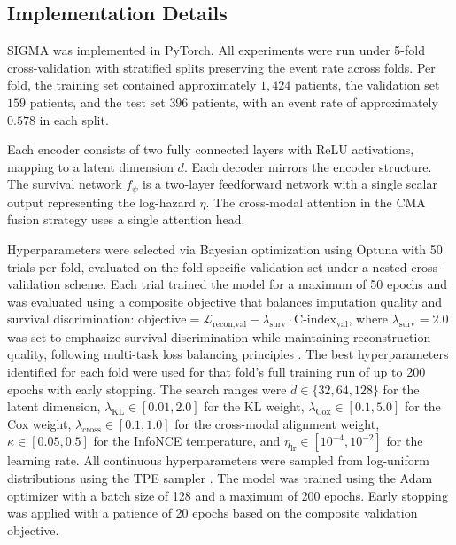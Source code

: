 \documentclass[final,3p,times,authoryear]{elsarticle}
\begin{document}
\subsection{Implementation Details}

SIGMA was implemented in PyTorch. All experiments were run under 5-fold cross-validation with stratified splits preserving the event rate across folds. Per fold, the training set contained approximately $1{,}424$ patients, the validation set $159$ patients, and the test set $396$ patients, with an event rate of approximately $0.578$ in each split.

Each encoder consists of two fully connected layers with ReLU activations, mapping to a latent dimension $d$. Each decoder mirrors the encoder structure. The survival network $f_\psi$ is a two-layer feedforward network with a single scalar output representing the log-hazard $\eta$. The cross-modal attention in the CMA fusion strategy uses a single attention head.

Hyperparameters were selected via Bayesian optimization using Optuna \citep{akiba2019optuna} with 50 trials per fold, evaluated on the fold-specific validation set under a nested cross-validation scheme. Each trial trained the model for a maximum of 50 epochs and was evaluated using a composite objective that balances imputation quality and survival discrimination: $\text{objective} = \mathcal{L}_{\text{recon,val}} - \lambda_{\text{surv}} \cdot \text{C-index}_{\text{val}}$, where $\lambda_{\text{surv}} = 2.0$ was set to emphasize survival discrimination while maintaining reconstruction quality, following multi-task loss balancing principles \citep{kendall2018multitask, chapfuwa2020survival}. The best hyperparameters identified for each fold were used for that fold's full training run of up to 200 epochs with early stopping. The search ranges were $d \in \{32, 64, 128\}$ for the latent dimension, $\lambda_{\text{KL}} \in [0.01, 2.0]$ for the KL weight, $\lambda_{\text{Cox}} \in [0.1, 5.0]$ for the Cox weight, $\lambda_{\text{cross}} \in [0.1, 1.0]$ for the cross-modal alignment weight, $\kappa \in [0.05, 0.5]$ for the InfoNCE temperature, and $\eta_{\text{lr}} \in [10^{-4}, 10^{-2}]$ for the learning rate. All continuous hyperparameters were sampled from log-uniform distributions using the TPE sampler \citep{akiba2019optuna}. The model was trained using the Adam optimizer with a batch size of 128 and a maximum of 200 epochs. Early stopping was applied with a patience of 20 epochs based on the composite validation objective.
\end{document}
